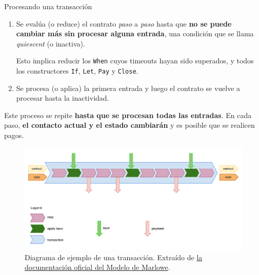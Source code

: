 \documentclass{beamer}
\begin{document}
\begin{frame}{Procesando una transacción}
\begin{enumerate}
    \item Se evalúa (o reduce) el contrato \textit{paso} a \textit{paso} hasta que \textbf{no se puede cambiar más sin procesar alguna entrada}, una condición que se llama \textit{quiescent} (o inactiva).

    \medskip
    Esto implica reducir los \texttt{When} cuyos timeouts hayan sido superados, y todos los constructores \texttt{If}, \texttt{Let}, \texttt{Pay} y \texttt{Close}.

    \vfill
    \pause

    \item Se procesa (o aplica) la primera entrada y luego el contrato se vuelve a procesar hasta la inactividad. 
\end{enumerate}
\vfill
\pause
Este proceso se repite \textbf{hasta que se procesan todas las entradas}. En cada paso, \textbf{el contacto actual y el estado cambiarán} y es posible que se realicen pagos.
\end{frame}

\begin{frame}

\begin{figure}[H]
    \centering
    \includegraphics[width=\textwidth]{Transaccion.png}
    \caption[Diagrama de ejemplo de una transacción.]{Diagrama de ejemplo de una transacción. Extraído de \href{https://play.marlowe-finance.io/doc/marlowe/tutorials/marlowe-model.html}{la documentación oficial del Modelo de Marlowe}.}\label{fig:Transaccion}
\end{figure}

\end{frame}
\end{document}
